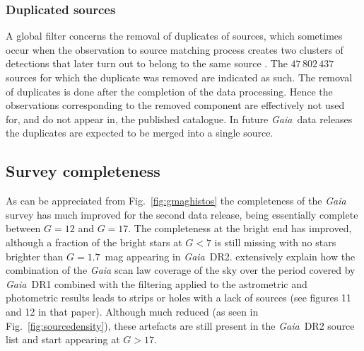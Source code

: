 \documentclass[longauth]{aa_gaia} %
\newcommand\gaia{\textit{Gaia}}
\newcommand\gdr[1]{\gaia~DR#1}
\newcommand\figref[1]{Fig.~\ref{#1}}
\begin{document}
\subsubsection{Duplicated sources}

A global filter concerns the removal of duplicates of sources, which sometimes occur when the
observation to source matching process creates two clusters of detections that later turn out to
belong to the same source \citep[see][]{2016A&A...595A...2G, 2016A&A...595A...3F}. The
$47\,802\,437$ sources for which the duplicate was removed are indicated as such. The removal of
duplicates is done after the completion of the data processing. Hence the observations corresponding
to the removed component are effectively not used for, and do not appear in, the published
catalogue. In future \gaia\ data releases the duplicates are expected to be merged into a single
source.

\subsection{Survey completeness}

As can be appreciated from \figref{fig:gmaghistos} the completeness of the {\gaia} survey has much
improved for the second data release, being essentially complete between $G=12$ and $G=17$. The
completeness at the bright end has improved, although a fraction of the bright stars at $G<7$ is
still missing with no stars brighter than $G=1.7$~mag appearing in \gdr{2}.
\cite{2016A&A...595A...2G} extensively explain how the combination of the {\gaia} scan law coverage
of the sky over the period covered by \gdr{1} combined with the filtering applied to the
astrometric and photometric results leads to strips or holes with a lack of sources (see figures
11 and 12 in that paper). Although much reduced (as seen in \figref{fig:sourcedensity}), these
artefacts are still present in the \gdr{2} source list and start appearing at $G>17$.
\end{document}
